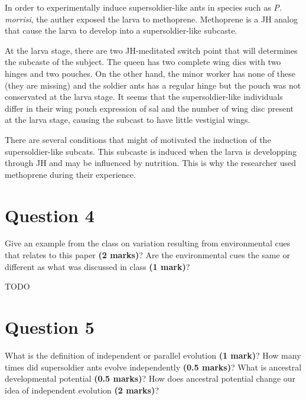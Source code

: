 \documentclass[letterpaper,12pt]{article}
\newenvironment{myindentpar}[1]%
{\begin{list}{}%
          {\setlength{\leftmargin}{#1}}%
          \item[]%
}
{\end{list}}
\begin{document}
\begin{myindentpar}{0.5cm}
In order to experimentally induce supersoldier-like ants in species such as \textit{P. morrisi}, the auther exposed the larva to methoprene. Methoprene is a JH analog that cause the larva to develop into a supersoldier-like subcaste.

At the larva stage, there are two JH-meditated switch point that will determines the subcaste of the subject. The queen has two complete wing dics with two hinges and two pouches. On the other hand, the minor worker has none of these (they are missing) and the soldier ants has a regular hinge but the pouch was not conservated at the larva stage. It seems that the supersoldier-like individuals differ in their wing pouch expression of sal and the number of wing disc present at the larva stage, causing the subcast to have little vestigial wings. 

There are several conditions that might of motivated the induction of the supersoldier-like subcats. This subcaste is induced when the larva is developping through JH and may be influenced by nutrition. This is why the researcher used methoprene during their experience.
\end{myindentpar}



\section{Question 4}

Give an example from the class on variation resulting from environmental cues that relates to this paper \textbf{(2 marks)}? Are the environmental cues the same or different as what was discussed in class \textbf{(1 mark)}?

\begin{myindentpar}{0.5cm}
TODO
\end{myindentpar}



\section{Question 5}

What is the definition of independent or parallel evolution \textbf{(1 mark)}? How many times did supersoldier ants evolve independently \textbf{(0.5 marks)}? What is ancestral developmental potential \textbf{(0.5 marks)}? How does ancestral potential change our idea of independent evolution \textbf{(2 marks)}?
\vspace*{20px}
\end{document}
